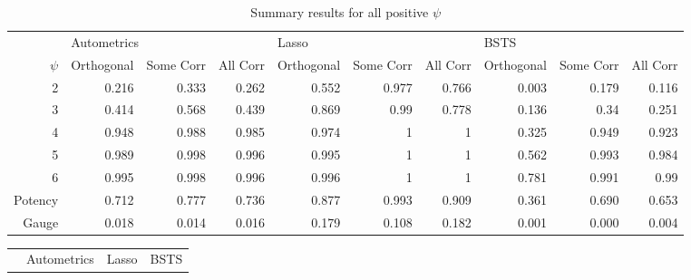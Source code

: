 \documentclass[11pt, oneside]{book}   	%
\begin{document}
\begin{landscape}

\begin{table}[htbp]
  \centering

    \begin{tabular}{rrrrrrrrrr}
   & \multicolumn{3}{l}{Autometrics} & \multicolumn{3}{l}{Lasso} & \multicolumn{3}{l}{BSTS} \\
 
    $\psi$ & Orthogonal  & Some Corr & All Corr & Orthogonal  & Some Corr & All Corr & Orthogonal  & Some Corr & All Corr \\
    2     & 0.216 & 0.333 & 0.262 & 0.552 & 0.977 & 0.766 & 0.003 & 0.179 & 0.116 \\
    3     & 0.414 & 0.568 & 0.439 & 0.869 & 0.99  & 0.778 & 0.136 & 0.34  & 0.251 \\
    4     & 0.948 & 0.988 & 0.985 & 0.974 & 1     & 1     & 0.325 & 0.949 & 0.923 \\
    5     & 0.989 & 0.998 & 0.996 & 0.995 & 1     & 1     & 0.562 & 0.993 & 0.984 \\
    6     & 0.995 & 0.998 & 0.996 & 0.996 & 1     & 1     & 0.781 & 0.991 & 0.99 \\
   
    Potency & 0.712 & 0.777 & 0.736 & 0.877 & 0.993 & 0.909 & 0.361 & 0.690 & 0.653 \\
    Gauge & 0.018 & 0.014 & 0.016 & 0.179 & 0.108 & 0.182 & 0.001 & 0.000 & 0.004 \\


 
    \end{tabular}%
 
    \caption{Summary results for all positive $\psi$}
     \label{tab:SummaryPositive}%
\end{table}%

\begin{table}[htbp]
  \centering

    \begin{tabular}{rrrrrrrrrr}

          & \multicolumn{3}{l}{Autometrics} & \multicolumn{3}{l}{Lasso} & \multicolumn{3}{l}{BSTS} \\


\end{tabular}
\end{table}
\end{landscape}
\end{document}
